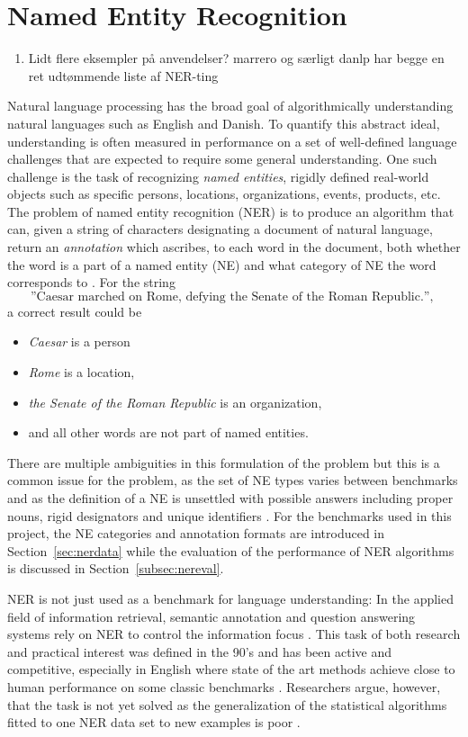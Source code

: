 \documentclass[main.tex]{subfiles}
\begin{document}
\section{Named Entity Recognition}
\begin{enumerate}
    \item Lidt flere eksempler på anvendelser? marrero og særligt danlp har begge en ret udtømmende liste af NER-ting
\end{enumerate}
Natural language processing has the broad goal of algorithmically understanding natural languages such as English and Danish.
To quantify this abstract ideal, understanding is often measured in performance on a set of well-defined language challenges that are expected to require some general understanding.
One such challenge is the task of recognizing \emph{named entities}, rigidly defined real-world objects such as specific persons, locations, organizations, events, products, etc.
The problem of named entity recognition (NER) is to produce an algorithm that can, given a string of characters designating a document of natural language, return an \emph{annotation} which ascribes, to each word in the document, both whether the word is a part of a named entity (NE) and what category of NE the word corresponds to \cite{wiki2021ner}.
For the string
\[
    \text{
        ''Caesar marched on Rome, defying the Senate of the Roman Republic.'',
    }
\]
a correct result could be
\begin{itemize}
    \item \emph{Caesar} is a person 
    \item \emph{Rome} is a location,
    \item \emph{the Senate of the Roman Republic} is an organization,
    \item and all other words are not part of named entities.
\end{itemize}
There are multiple ambiguities in this formulation of the problem but this is a common issue for the problem, as the set of NE types varies between benchmarks and as the definition of a NE is unsettled with possible answers including proper nouns, rigid designators and unique identifiers \cite[Sec. 4]{marrero2013ner}.
For the benchmarks used in this project, the NE categories and annotation formats are introduced in Section~\ref{sec:nerdata} while the evaluation of the performance of NER algorithms is discussed in Section~\ref{subsec:nereval}.

NER is not just used as a benchmark for language understanding:
In the applied field of information retrieval, semantic annotation and question answering systems rely on NER to control the information focus \cite[Sec. 2]{marrero2013ner}.
This task of both research and practical interest was defined in the 90's and has been active and competitive, especially in English where state of the art methods achieve close to human performance on some classic benchmarks \cite{wiki2021ner, marrero2013ner}.
Researchers argue, however, that the task is not yet solved as the generalization of the statistical algorithms fitted to one NER data set to new examples is poor \cite[Sec. 7.2]{marrero2013ner}.
\end{document}
